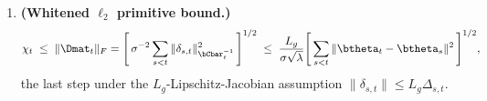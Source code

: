 \begin{lemma}
\begin{enumerate}[nosep,label=(\alph*),leftmargin=1.6em]
\begin{equation}
    \bC_t \;\preceq\; (1+\chi_t)^2\,\bCbar_t,
    \qquad\text{hence}\qquad
    \bar s_t^2(a)\;\le\;(1+\chi_t)^2\,s_t^2(a)\ \ \forall a.
  \end{equation}
  A predictable certificate $\bar\chi_t\ge\chi_t$ therefore satisfies
   in the exact case $\Calg_t=\bC_t$ with the uniform
  factor $u_t=(1+\bar\chi_t)^2$.
\item \textbf{(Whitened $\ell_2$ primitive bound.)}
  \begin{equation}\label{eq:chi-primitive}
    \chi_t \;\le\; \|\Dmat_t\|_F
    = \Biggl[\,\sigma^{-2}\sum_{s<t}\|\delta_{s,t}\|_{\bCbar_t^{-1}}^2\,\Biggr]^{1/2}
    \;\le\;
    \frac{L_g}{\sigma\sqrt{\lambda}}
    \Biggl[\,\sum_{s<t}\|\btheta_t-\btheta_s\|^2\,\Biggr]^{1/2},
  \end{equation}
  the last step under the $L_g$-Lipschitz-Jacobian assumption
  $\|\delta_{s,t}\|\le L_g\Delta_{s,t}$.
\end{enumerate}
\end{lemma}
